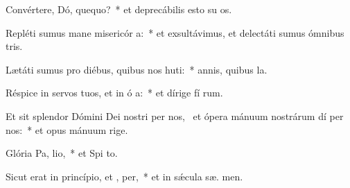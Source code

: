 \item Convértere, Dó, quequo?~* et deprecábilis esto su  os.
\item Repléti sumus mane misericór a:~* et exsultávimus, et delectáti sumus ómnibus  tris.
\item Lætáti sumus pro diébus, quibus nos huti:~* annis, quibus  la.
\item Réspice in servos tuos, et in ó a:~* et dírige fí rum.
\item Et sit splendor Dómini Dei nostri per nos,~\pscross{} et ópera mánuum nostrárum dí per nos:~* et opus mánuum  rige.
\item Glória Pa,  lio,~* et Spi to.
\item Sicut erat in princípio, et ,  per,~* et in sǽcula sæ. men.
